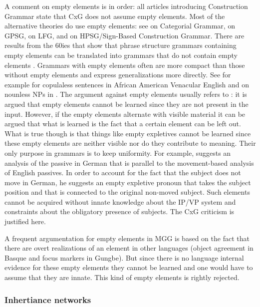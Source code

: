 \documentclass[output=paper]{langsci/langscibook}
\begin{document}
A comment on empty elements is in order: all articles introducing Construction Grammar state that
CxG does not assume empty elements. Most of the alternative theories do use empty elements: see
\citet{KoenigE99a-u} on Categorial Grammar, \citet*[]{GKPS85a} on GPSG, \citet[]{Bresnan2001a} on LFG,  and  on HPSG/Sign-Based
Construction Grammar. There are results from the 60ies that show that phrase structure grammars
containing empty elements can be translated into grammars that do not contain empty elements
\citep*[, Lemma~4.1]{BHPS61a}. Grammars with empty elements often are more compact than
those without empty elements and express generalizations more directly. See for example
\citet{Bender2000a} for copulaless sentences in African American Venacular
English and \citet{Mueller2004e} on nounless NPs in
. The argument against empty elements usually refers to : it
is argued that empty elements cannot be learned since they are not present in the input. However,
if the empty elements alternate with visible material it can be argued that what is learned is the
fact that a certain element can be left out. What is true though is that things like empty
expletives cannot be learned since these empty elements are neither visible nor do they contribute to
meaning. Their only purpose in grammars is to keep uniformity. For example, \citet{Grewendorf93}
suggests an analysis of the passive in German that is parallel to the movement-based analysis of English
passives. In order to account for the fact that the subject does not move in German, he suggests an
empty expletive pronoun that takes the subject position and that is connected to the original
non-moved subject. Such elements cannot be acquired without innate knowledge about the IP/VP system and
constraints about the obligatory presence of subjects. The CxG criticism is justified here.

A frequent argumentation for empty elements in MGG is based on the fact that there are overt
realizations of an element in other languages (\eg object agreement in Basque and focus markers in
Gungbe). But since there is no language internal evidence for these empty elements they cannot be
learned and one would have to assume that they are innate. This kind of empty elements is rightly
rejected. 

\subsubsection{Inhertiance networks}
\end{document}
